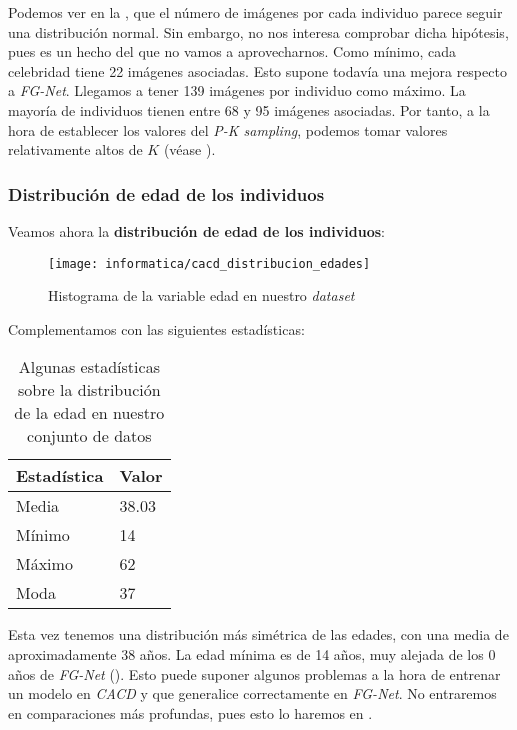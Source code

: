 Podemos ver en la , que el número de imágenes por cada individuo parece seguir una distribución normal. Sin embargo, no nos interesa comprobar dicha hipótesis, pues es un hecho del que no vamos a aprovecharnos. Como mínimo, cada celebridad tiene 22 imágenes asociadas. Esto supone todavía una mejora respecto a \textit{FG-Net}. Llegamos a tener 139 imágenes por individuo como máximo. La mayoría de individuos tienen entre 68 y 95 imágenes asociadas. Por tanto, a la hora de establecer los valores del \textit{P-K sampling}, podemos tomar valores relativamente altos de $K$ (véase ).

\subsubsection{Distribución de edad de los individuos}

Veamos ahora la \textbf{distribución de edad de los individuos}:

\begin{figure}[H]
    \centering
    \texttt{[image: informatica/cacd\_distribucion\_edades]}
    \caption{Histograma de la variable edad en nuestro \textit{dataset}}
\end{figure}

Complementamos con las siguientes estadísticas:

\begin{table}[H]
\centering
\begin{tabular}{|l|l|}
    \hline
    \textbf{Estadística} & \textbf{Valor} \\
    \hline

    Media  & 38.03 \\
    Mínimo & 14    \\
    Máximo & 62    \\
    Moda   & 37    \\

    \hline

\end{tabular}
\caption{Algunas estadísticas sobre la distribución de la edad en nuestro conjunto de datos}
\end{table}

Esta vez tenemos una distribución más simétrica de las edades, con una media de aproximadamente 38 años. La edad mínima es de 14 años, muy alejada de los 0 años de \textit{FG-Net} (). Esto puede suponer algunos problemas a la hora de entrenar un modelo en \textit{CACD} y que generalice correctamente en \textit{FG-Net}. No entraremos en comparaciones más profundas, pues esto lo haremos en .

